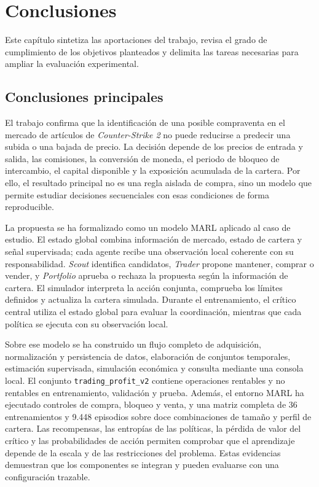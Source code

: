 \chapter{Conclusiones}

\noindent Este capítulo sintetiza las aportaciones del trabajo, revisa el grado de cumplimiento de los objetivos planteados y delimita las tareas necesarias para ampliar la evaluación experimental.

\section{Conclusiones principales}

El trabajo confirma que la identificación de una posible compraventa en el mercado de artículos de \textit{Counter-Strike 2} no puede reducirse a predecir una subida o una bajada de precio. La decisión depende de los precios de entrada y salida, las comisiones, la conversión de moneda, el periodo de bloqueo de intercambio, el capital disponible y la exposición acumulada de la cartera. Por ello, el resultado principal no es una regla aislada de compra, sino un modelo que permite estudiar decisiones secuenciales con esas condiciones de forma reproducible.

La propuesta se ha formalizado como un modelo MARL aplicado al caso de estudio. El estado global combina información de mercado, estado de cartera y señal supervisada; cada agente recibe una observación local coherente con su responsabilidad. \textit{Scout} identifica candidatos, \textit{Trader} propone mantener, comprar o vender, y \textit{Portfolio} aprueba o rechaza la propuesta según la información de cartera. El simulador interpreta la acción conjunta, comprueba los límites definidos y actualiza la cartera simulada. Durante el entrenamiento, el crítico central utiliza el estado global para evaluar la coordinación, mientras que cada política se ejecuta con su observación local.

Sobre ese modelo se ha construido un flujo completo de adquisición, normalización y persistencia de datos, elaboración de conjuntos temporales, estimación supervisada, simulación económica y consulta mediante una consola local. El conjunto \texttt{trading\_profit\_v2} contiene operaciones rentables y no rentables en entrenamiento, validación y prueba. Además, el entorno MARL ha ejecutado controles de compra, bloqueo y venta, y una matriz completa de 36 entrenamientos y 9.448 episodios sobre doce combinaciones de tamaño y perfil de cartera. Las recompensas, las entropías de las políticas, la pérdida de valor del crítico y las probabilidades de acción permiten comprobar que el aprendizaje depende de la escala y de las restricciones del problema. Estas evidencias demuestran que los componentes se integran y pueden evaluarse con una configuración trazable.

